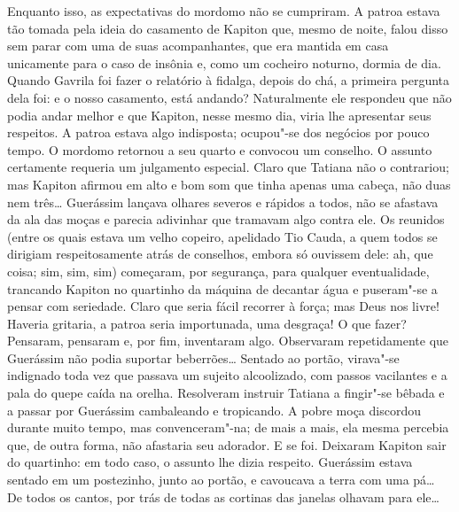 Enquanto isso, as expectativas do mordomo não se cumpriram. A patroa
estava tão tomada pela ideia do casamento de Kapiton que, mesmo de
noite, falou disso sem parar com uma de suas acompanhantes, que era
mantida em casa unicamente para o caso de insônia e, como um cocheiro
noturno, dormia de dia. Quando Gavrila foi fazer o relatório à fidalga,
depois do chá, a primeira pergunta dela foi: e o nosso casamento, está
andando? Naturalmente ele respondeu que não podia andar melhor e que
Kapiton, nesse mesmo dia, viria lhe apresentar seus respeitos. A patroa
estava algo indisposta; ocupou"-se dos negócios por pouco tempo. O
mordomo retornou a seu quarto e convocou um conselho. O assunto
certamente requeria um julgamento especial. Claro que Tatiana não o
contrariou; mas Kapiton afirmou em alto e bom som que tinha apenas uma
cabeça, não duas nem três\ldots{} Guerássim lançava olhares severos e rápidos
a todos, não se afastava da ala das moças e parecia adivinhar que
tramavam algo contra ele. Os reunidos (entre os quais estava um
velho copeiro, apelidado Tio Cauda, a quem todos se dirigiam
respeitosamente atrás de conselhos, embora só ouvissem dele: ah, que
coisa; sim, sim, sim) começaram, por segurança, para qualquer
eventualidade, trancando Kapiton no quartinho da máquina de decantar
água e puseram"-se a pensar com seriedade. Claro que seria fácil recorrer
à força; mas Deus nos livre! Haveria gritaria, a patroa seria
importunada, uma desgraça! O que fazer? Pensaram, pensaram e, por fim,
inventaram algo. Observaram repetidamente que Guerássim não podia
suportar beberrões\ldots{} Sentado ao portão, virava"-se indignado toda vez
que passava um sujeito alcoolizado, com passos vacilantes e a pala do
quepe caída na orelha. Resolveram instruir Tatiana a fingir"-se bêbada e
a passar por Guerássim cambaleando e tropicando. A pobre moça discordou
durante muito tempo, mas convenceram"-na; de mais a mais, ela mesma
percebia que, de outra forma, não afastaria seu adorador. E se foi.
Deixaram Kapiton sair do quartinho: em todo caso, o assunto lhe dizia
respeito. Guerássim estava sentado em um postezinho, junto ao portão, e
cavoucava a terra com uma pá\ldots{} De todos os cantos, por trás de todas as
cortinas das janelas olhavam para ele\ldots{}

